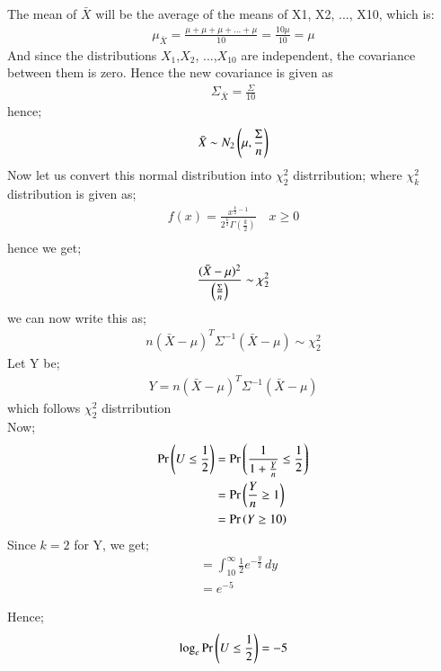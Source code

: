 \documentclass[journal,12pt,onecolumn]{IEEEtran}
\theoremstyle{remark}
\begin{document}
The mean of $\bar{X}$ will be the average of the means of X1, X2, ..., X10, which is:
\begin{align}
    \mu_{\bar{X}} =\frac{\mu + \mu + \mu + ... + \mu}{10} = \frac{10\mu}{10} = \mu   
\end{align}
And since the distributions $X_1$,$X_2$, ...,$X_{10}$ are independent, the covariance between them is zero. Hence the 
new covariance is given as
\begin{align}
    \Sigma_{\bar{X}} = \frac{\Sigma}{10}
\end{align}
hence;
\begin{align}
    \bar{X} \sim N_2\left(\mu,\frac{\Sigma}{n}\right)
\end{align}
Now let us convert this normal distribution into $\chi^{2}_{2}$ distrribution; where $\chi^{2}_{k}$ distribution is given as;
\begin{align}
    f(x) = \frac{x^{\frac{k}{2}-1}}{2^{\frac{k}{2}}\Gamma(\frac{k}{2})} \quad  x \ge 0\\
\end{align}
hence we get;
\begin{align}
    \frac{(\bar{X}-\mu)^2}{\left(\frac{\Sigma}{n}\right)} \sim \chi^{2}_{2}
\end{align}
we can now write this as;
\begin{align}
    n(\bar{X} - \mu)^T\Sigma^{-1}(\bar{X} - \mu) \sim \chi^{2}_{2}
\end{align}
Let Y be;
\begin{align}
    Y = n(\bar{X} - \mu)^T\Sigma^{-1}(\bar{X} - \mu)
\end{align}
which follows $\chi^{2}_{2}$ distrribution\\
Now;
\begin{align}
    \Pr\left(U \le \frac{1}{2}\right)
    &= \Pr\left(\frac{1}{1+\frac{Y}{n}} \le \frac{1}{2}\right)\\
    &= \Pr\left(\frac{Y}{n} \ge 1\right)\\
    &= \Pr\left(Y \ge 10\right)
\end{align}
Since $k=2$ for Y, we get;
\begin{align}
    &= \int_{10}^{\infty} \frac{1}{2}e^{-\frac{y}{2}} \,dy\\
    &= e^{-5}   
\end{align}

Hence;
\begin{align}
    \log_e \Pr\left(U \le \frac{1}{2}\right) = -5
\end{align}
\end{document}
